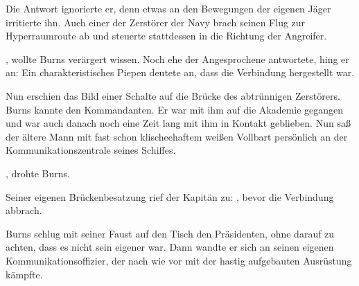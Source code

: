 \par

Die Antwort ignorierte er, denn etwas an den Bewegungen der eigenen Jäger irritierte ihn. Auch einer der Zerstörer der Navy brach seinen Flug zur Hyperraumroute ab und steuerte stattdessen in die Richtung der Angreifer.

\par

, wollte Burns verärgert wissen. Noch ehe der Angesprochene antwortete, hing er an:  Ein charakteristisches Piepen deutete an, dass die Verbindung hergestellt war. 

\par

Nun erschien das Bild einer Schalte auf die Brücke des abtrünnigen Zerstörers. Burns kannte den Kommandanten. Er war mit ihm auf die Akademie gegangen und war auch danach noch eine Zeit lang mit ihm in Kontakt geblieben. Nun saß der ältere Mann mit fast schon klischeehaftem weißen Vollbart persönlich an der Kommunikationszentrale seines Schiffes.

\par


\par

, drohte Burns. 

\par

 Seiner eigenen Brückenbesatzung rief der Kapitän zu: , bevor die Verbindung abbrach.

\par

 Burns schlug mit seiner Faust auf den Tisch den Präsidenten, ohne darauf zu achten, dass es nicht sein eigener war.  Dann wandte er sich an seinen eigenen Kommunikationsoffizier, der nach wie vor mit der hastig aufgebauten Ausrüstung kämpfte. 

